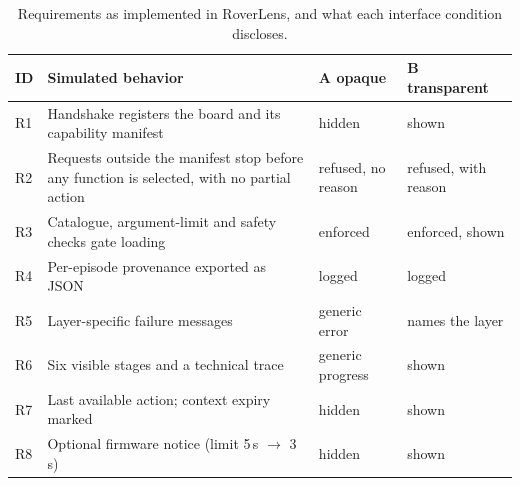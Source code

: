 \documentclass[sigconf]{acmart}
\begin{document}
\begin{table}[t]
  \caption{Requirements as implemented in RoverLens, and what each interface condition discloses.}
  \label{tab:req-sim}
  \small
  \begin{tabular}{@{}p{0.55cm}>{\raggedright\arraybackslash}p{3.4cm}>{\raggedright\arraybackslash}p{1.35cm}>{\raggedright\arraybackslash}p{1.65cm}@{}}
    \toprule
    ID & Simulated behavior & A opaque & B transparent \\
    \midrule
    R1 & Handshake registers the board and its capability manifest & hidden & shown \\
    R2 & Requests outside the manifest stop before any function is selected, with no partial action & refused, no reason & refused, with reason \\
    R3 & Catalogue, argument-limit and safety checks gate loading & enforced & enforced, shown \\
    R4 & Per-episode provenance exported as JSON & logged & logged \\
    R5 & Layer-specific failure messages & generic error & names the layer \\
    R6 & Six visible stages and a technical trace & generic progress & shown \\
    R7 & Last available action; context expiry marked & hidden & shown \\
    R8 & Optional firmware notice (limit 5\,s $\rightarrow$ 3\,s) & hidden & shown \\
    \bottomrule
  \end{tabular}
\end{table}
\end{document}
